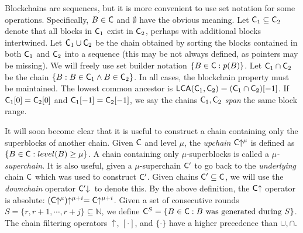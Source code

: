 Blockchains are sequences, but it is more convenient to use set notation for
some operations. Specifically, $B \in \mathsf{C}$ and $\emptyset$ have the obvious
meaning. Let $\mathsf{C}_1 \subseteq \mathsf{C}_2$ denote that all blocks in $\mathsf{C}_1$ exist
in $\mathsf{C}_2$, perhaps with additional blocks intertwined. Let $\mathsf{C}_1 \cup
\mathsf{C}_2$ be the chain obtained by sorting the blocks contained in both
$\mathsf{C}_1$ and $\mathsf{C}_2$ into a sequence (this may be not always defined, as
pointers may be missing). We will freely use set builder notation $\{B \in
\mathsf{C}: p(B)\}$. Let $\mathsf{C}_1 \cap \mathsf{C}_2$ be the chain $\{B: B \in \mathsf{C}_1
\land B \in \mathsf{C}_2\}$. In all cases, the blockchain property must be
maintained. The lowest common ancestor is $\textsf{LCA}(\mathsf{C}_1, \mathsf{C}_2) =
(\mathsf{C}_1 \cap \mathsf{C}_2)[-1]$. If $\mathsf{C}_1[0] = \mathsf{C}_2[0]$ and $\mathsf{C}_1[-1]
= \mathsf{C}_2[-1]$, we say the chains $\mathsf{C}_1, \mathsf{C}_2$ \emph{span} the same
block range.

It will soon become clear that it is useful to construct a chain containing only
the superblocks of another chain. Given $\mathsf{C}$ and level $\mu$, the
\emph{upchain} $\mathsf{C}\negthickspace\uparrow^\mu$ is defined as $\{B \in \mathsf{C}: level(B)
\geq \mu\}$. A chain containing only $\mu$-superblocks is called a
$\mu$\emph{-superchain}. It is also useful, given a $\mu$-superchain $\mathsf{C}'$
to go back to the \emph{underlying} chain $\mathsf{C}$ which was used to construct
$\mathsf{C}'$. Given chains $\mathsf{C}' \subseteq
\mathsf{C}$, we will use the \emph{downchain} operator $\mathsf{C}'\negthickspace\downarrow\,$ to denote
this.
By the above definition, the $\mathsf{C}\negthickspace\uparrow$
operator is absolute: $(\mathsf{C}\negthickspace\uparrow^\mu)\negthickspace\uparrow^{\mu + i} =
\mathsf{C}\negthickspace\uparrow^{\mu + i}$. Given a set of consecutive rounds $S = \{r, r + 1,
\cdots, r + j\} \subseteq \mathbb{N}$, we define $\mathsf{C}^S = \{B \in \mathsf{C}: B
\text{ was generated during } S\}$. The chain filtering operators~
$\negthickspace\uparrow$, $[\cdot]$, and $\{\cdot\}$ have a higher precedence than
$\cup, \cap$.
